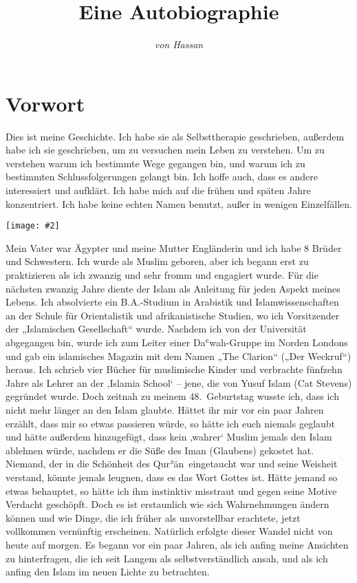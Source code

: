 \documentclass[12pt]{memoir}
\title{Eine Autobiographie}
\author{\emph{von Hassan}}
\def\´{ʾ} %
\def\`{ʿ} %
\def \Quran{Qur\-\´ān} %
\newcommand{\img}[3]{\begin{center}%
\texttt{[image: \#2]}\\{\small\em#3}%
\end{center}}
\begin{document}
\frontmatter

\maketitle
\thispagestyle{empty}
\cleardoublepage

\setcounter{page}{1}
\tableofcontents

\chapter{Vorwort}

Dies ist meine Geschichte. Ich habe sie als Selbsttherapie geschrieben,
außerdem habe ich sie geschrieben, um zu versuchen mein Leben zu verstehen.
Um zu verstehen warum ich bestimmte Wege gegangen bin,
und warum ich zu bestimmten Schlussfolgerungen gelangt bin.
Ich hoffe auch, dass es andere interessiert und aufklärt.
Ich habe mich auf die frühen und späten Jahre konzentriert.
Ich habe keine echten Namen benutzt, außer in wenigen Einzelfällen.

\img{scale=0.1}{Tunis_Hassan.jpg}{}

Mein Vater war Ägypter und meine Mutter Engländerin
und ich habe 8 Brüder und Schwestern.
Ich wurde als Muslim geboren, aber ich begann erst zu praktizieren
als ich zwanzig und sehr fromm und engagiert wurde.
Für die nächsten zwanzig Jahre diente der Islam als Anleitung
für jeden Aspekt meines Lebens.
Ich absolvierte ein B.A.-Studium in Arabistik und Islamwissenschaften
an der Schule für Orientalistik und afrikanistische Studien,
wo ich Vorsitzender der „Islamischen Gesellschaft“ wurde.
Nachdem ich von der Universität abgegangen bin,
wurde ich zum Leiter einer Da\`wah-Gruppe im Norden Londons
und gab ein islamisches Magazin mit dem Namen
„The Clarion“ („Der Weckruf“) heraus.
Ich schrieb vier Bücher für muslimische Kinder
und verbrachte fünfzehn Jahre als Lehrer an der ‚Islamia School‘ –
jene, die von Yusuf Islam (Cat Stevens) gegründet wurde.
Doch zeitnah zu meinem 48.\ Geburtstag wusste ich,
dass ich nicht mehr länger an den Islam glaubte.
Hättet ihr mir vor ein paar Jahren erzählt,
dass mir so etwas passieren würde,
so hätte ich euch niemals geglaubt und hätte außerdem hinzugefügt,
dass kein ‚wahrer‘ Muslim jemals den Islam ablehnen würde,
nachdem er die Süße des Iman (Glaubens) gekostet hat.
Niemand, der in die Schönheit des \Quran\ eingetaucht war
und seine Weisheit verstand, könnte jemals leugnen,
dass es das Wort Gottes ist. Hätte jemand so etwas behauptet,
so hätte ich ihm instinktiv misstraut
und gegen seine Motive Verdacht geschöpft.
Doch es ist erstaunlich wie sich Wahrnehmungen ändern können und wie Dinge,
die ich früher als unvorstellbar erachtete,
jetzt vollkommen vernünftig erscheinen.
Natürlich erfolgte dieser Wandel nicht von heute auf morgen.
Es begann vor ein paar Jahren,
als ich anfing meine Ansichten zu hinterfragen,
die ich seit Langem als selbstverständlich ansah,
und als ich anfing den Islam im neuen Lichte zu betrachten.
\end{document}
